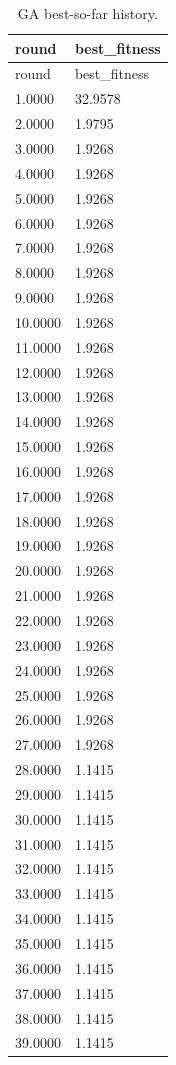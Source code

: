 \documentclass[11pt]{report}
\begin{document}
\begin{longtable}{ll}
\caption{GA best-so-far history.}\\
\toprule
round & best\_fitness \\
\midrule
\endfirsthead
\toprule
round & best\_fitness \\
\midrule
\endhead
1.0000 & 32.9578 \\
2.0000 & 1.9795 \\
3.0000 & 1.9268 \\
4.0000 & 1.9268 \\
5.0000 & 1.9268 \\
6.0000 & 1.9268 \\
7.0000 & 1.9268 \\
8.0000 & 1.9268 \\
9.0000 & 1.9268 \\
10.0000 & 1.9268 \\
11.0000 & 1.9268 \\
12.0000 & 1.9268 \\
13.0000 & 1.9268 \\
14.0000 & 1.9268 \\
15.0000 & 1.9268 \\
16.0000 & 1.9268 \\
17.0000 & 1.9268 \\
18.0000 & 1.9268 \\
19.0000 & 1.9268 \\
20.0000 & 1.9268 \\
21.0000 & 1.9268 \\
22.0000 & 1.9268 \\
23.0000 & 1.9268 \\
24.0000 & 1.9268 \\
25.0000 & 1.9268 \\
26.0000 & 1.9268 \\
27.0000 & 1.9268 \\
28.0000 & 1.1415 \\
29.0000 & 1.1415 \\
30.0000 & 1.1415 \\
31.0000 & 1.1415 \\
32.0000 & 1.1415 \\
33.0000 & 1.1415 \\
34.0000 & 1.1415 \\
35.0000 & 1.1415 \\
36.0000 & 1.1415 \\
37.0000 & 1.1415 \\
38.0000 & 1.1415 \\
39.0000 & 1.1415 \\

\end{longtable}
\end{document}
